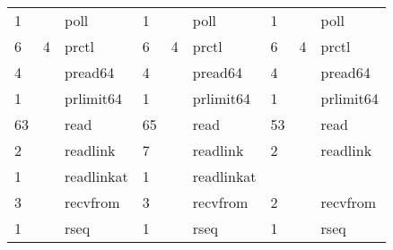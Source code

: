 \documentclass[submit,techreq,noauthor]{eco}	%
\begin{document}
\begin{table*}[t]
\begin{tabular}{|lllllllll|}
  \multicolumn{1}{|l|}{1}     & \multicolumn{1}{l|}{}       & \multicolumn{1}{l|}{poll}              & \multicolumn{1}{l|}{1}     & \multicolumn{1}{l|}{}       & \multicolumn{1}{l|}{poll}              & \multicolumn{1}{l|}{1}     & \multicolumn{1}{l|}{}       & poll              \\
  \multicolumn{1}{|l|}{6}     & \multicolumn{1}{l|}{4}      & \multicolumn{1}{l|}{prctl}             & \multicolumn{1}{l|}{6}     & \multicolumn{1}{l|}{4}      & \multicolumn{1}{l|}{prctl}             & \multicolumn{1}{l|}{6}     & \multicolumn{1}{l|}{4}      & prctl             \\
  \multicolumn{1}{|l|}{4}     & \multicolumn{1}{l|}{}       & \multicolumn{1}{l|}{pread64}           & \multicolumn{1}{l|}{4}     & \multicolumn{1}{l|}{}       & \multicolumn{1}{l|}{pread64}           & \multicolumn{1}{l|}{4}     & \multicolumn{1}{l|}{}       & pread64           \\
  \multicolumn{1}{|l|}{1}     & \multicolumn{1}{l|}{}       & \multicolumn{1}{l|}{prlimit64}         & \multicolumn{1}{l|}{1}     & \multicolumn{1}{l|}{}       & \multicolumn{1}{l|}{prlimit64}         & \multicolumn{1}{l|}{1}     & \multicolumn{1}{l|}{}       & prlimit64         \\
  \multicolumn{1}{|l|}{63}    & \multicolumn{1}{l|}{}       & \multicolumn{1}{l|}{read}              & \multicolumn{1}{l|}{65}    & \multicolumn{1}{l|}{}       & \multicolumn{1}{l|}{read}              & \multicolumn{1}{l|}{53}    & \multicolumn{1}{l|}{}       & read              \\
  \multicolumn{1}{|l|}{2}     & \multicolumn{1}{l|}{}       & \multicolumn{1}{l|}{readlink}          & \multicolumn{1}{l|}{7}     & \multicolumn{1}{l|}{}       & \multicolumn{1}{l|}{readlink}          & \multicolumn{1}{l|}{2}     & \multicolumn{1}{l|}{}       & readlink          \\
  \multicolumn{1}{|l|}{1}     & \multicolumn{1}{l|}{}       & \multicolumn{1}{l|}{readlinkat}        & \multicolumn{1}{l|}{1}     & \multicolumn{1}{l|}{}       & \multicolumn{1}{l|}{readlinkat}        & \multicolumn{1}{l|}{}      & \multicolumn{1}{l|}{}       &                   \\
  \multicolumn{1}{|l|}{3}     & \multicolumn{1}{l|}{}       & \multicolumn{1}{l|}{recvfrom}          & \multicolumn{1}{l|}{3}     & \multicolumn{1}{l|}{}       & \multicolumn{1}{l|}{recvfrom}          & \multicolumn{1}{l|}{2}     & \multicolumn{1}{l|}{}       & recvfrom          \\
  \multicolumn{1}{|l|}{1}     & \multicolumn{1}{l|}{}       & \multicolumn{1}{l|}{rseq}              & \multicolumn{1}{l|}{1}     & \multicolumn{1}{l|}{}       & \multicolumn{1}{l|}{rseq}              & \multicolumn{1}{l|}{1}     & \multicolumn{1}{l|}{}       & rseq              \\

\end{tabular}
\end{table*}
\end{document}
